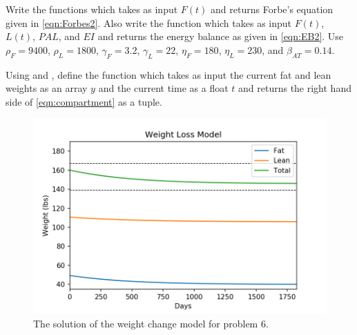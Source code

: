 \begin{problem}
Write the functions  which takes as input $F(t)$ and returns Forbe's equation given in \eqref{eqn:Forbes2}. Also write the function  which takes as input $F(t)$, $L(t)$, $PAL$, and $EI$ and returns the energy balance as given in \eqref{eqn:EB2}. Use $\rho_F = 9400$, $\rho_L = 1800$, $\gamma_F = 3.2$, $\gamma_L = 22$, $\eta_F = 180$, $\eta_L = 230$, and $\beta_{AT} = 0.14$.

Using  and , define the function  which takes as input the current fat and lean weights as an array  $y$ and the current time as a float $t$ and returns the right hand side of \eqref{eqn:compartment} as a tuple.
\end{problem}

\begin{figure}
\centering
\includegraphics[width=\textwidth]{figures/weightloss_graph.png}
\caption{The solution of the weight change model for problem 6.}
\label{fig:weightloss}
\end{figure}

